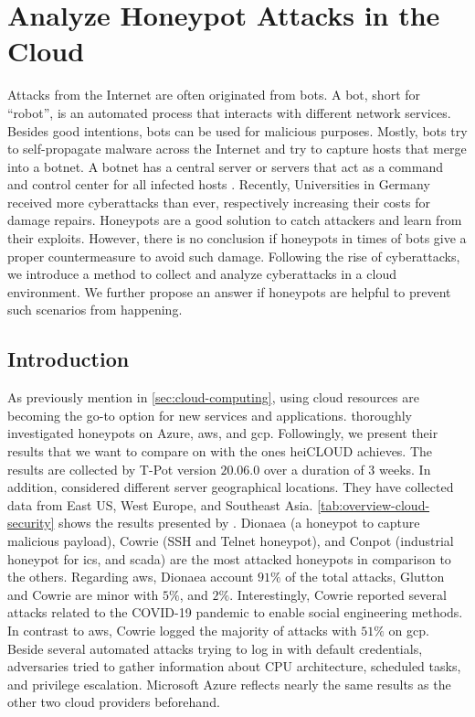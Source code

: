 \chapter{Analyze Honeypot Attacks in the Cloud}
\label{chap:cloud-security}

Attacks from the Internet are often originated from bots.
A bot, short for \enquote{robot}, is an automated process that interacts with different network services.
Besides good intentions, bots can be used for malicious purposes.
Mostly, bots try to self-propagate malware across the Internet and try to capture hosts that merge into a botnet.
A botnet has a central server or servers that act as a command and control center for all infected hosts \cite{Feily2009}.
Recently, Universities in Germany received more cyberattacks than ever, respectively increasing their costs for damage repairs.
Honeypots are a good solution to catch attackers and learn from their exploits.
However, there is no conclusion if honeypots in times of bots give a proper countermeasure to avoid such damage.
Following the rise of cyberattacks, we introduce a method to collect and analyze cyberattacks in a cloud environment.
We further propose an answer if honeypots are helpful to prevent such scenarios from happening.

\section{Introduction}

As previously mention in \autoref{sec:cloud-computing}, using cloud resources are becoming the go-to option for new services and applications.
\citet{Kelly2021} thoroughly investigated honeypots on Azure, \ac{aws}, and \ac{gcp}.
Followingly, we present their results that we want to compare on with the ones heiCLOUD achieves.
The results are collected by T-Pot version $20.06.0$ over a duration of 3 weeks.
In addition, \citet{Kelly2021} considered different server geographical locations.
They have collected data from East US, West Europe, and Southeast Asia.
\autoref{tab:overview-cloud-security} shows the results presented by \citet{Kelly2021}.
Dionaea (a honeypot to capture malicious payload), Cowrie (SSH and Telnet honeypot), and Conpot (industrial honeypot for \acs{ics}, and \acs{scada}) are the most attacked honeypots in comparison to the others.
Regarding \ac{aws}, Dionaea account $91\%$ of the total attacks, Glutton and Cowrie are minor with $5\%$, and $2\%$.
Interestingly, Cowrie reported several attacks related to the COVID-19 pandemic to enable social engineering methods.
In contrast to \ac{aws}, Cowrie logged the majority of attacks with $51\%$ on \ac{gcp}.
Beside several automated attacks trying to log in with default credentials, adversaries tried to gather information about CPU architecture, scheduled tasks, and privilege escalation.
Microsoft Azure reflects nearly the same results as the other two cloud providers beforehand.

